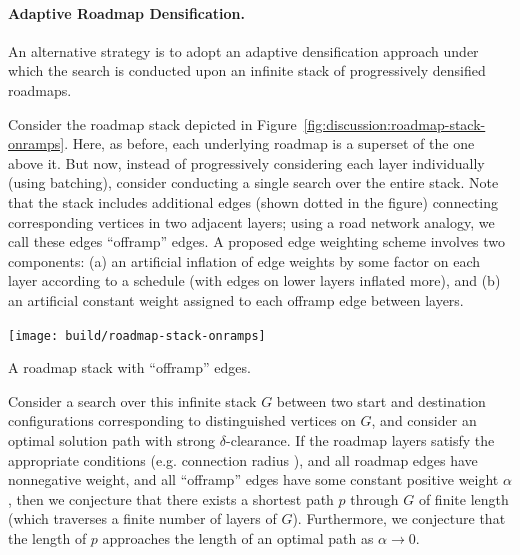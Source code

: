 \paragraph{Adaptive Roadmap Densification.}
An alternative strategy is to adopt an adaptive densification approach
under which the search is conducted upon an infinite stack of
progressively densified roadmaps.

Consider the roadmap stack depicted
in Figure~\ref{fig:discussion:roadmap-stack-onramps}.
Here, as before,
each underlying roadmap is a superset of the one above it.
But now,
instead of progressively considering each layer individually
(using batching),
consider conducting a single search over the entire stack.
Note that the stack includes additional edges
(shown dotted in the figure)
connecting corresponding vertices in two adjacent layers;
using a road network analogy,
we call these edges ``offramp'' edges.
A proposed edge weighting scheme involves two components:
(a) an artificial inflation of edge weights by some factor
on each layer according to a schedule
(with edges on lower layers inflated more),
and (b) an artificial constant weight assigned to each offramp edge
between layers.


\begin{marginfigure}
   \centering
   \texttt{[image: build/roadmap-stack-onramps]}
   \caption{A roadmap stack with ``offramp'' edges.}
   \label{fig:discussion:roadmap-stack-onramps}
\end{marginfigure}

Consider a search over this infinite stack $G$
between two start and destination
configurations corresponding to distinguished vertices on $G$,
and consider an optimal solution path with strong $\delta$-clearance.
If the roadmap layers satisfy the appropriate conditions
(e.g. connection radius
\citep{karaman2011samplingoptimal, janson2015deterministicsampling}),
and all roadmap edges have nonnegative weight,
and all ``offramp'' edges have some constant positive weight $\alpha$,
then we conjecture that there exists a shortest path $p$ through $G$
of finite length (which traverses a finite number of layers of $G$).
Furthermore,
we conjecture that the length of $p$ approaches the length of an
optimal path as $\alpha \rightarrow 0$.

